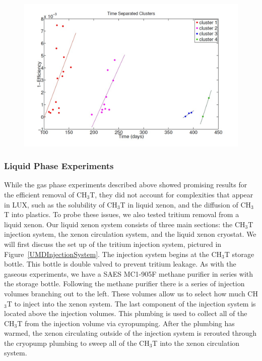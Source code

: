 \begin{figure}
\includegraphics[scale=.4]{GasPhaseRemoval_RestTime.jpg} 
\label{UMDGasRestTime}
\end{figure}



\subsubsection{Liquid Phase Experiments}

While the gas phase experiments described above showed promising results for the efficient removal of CH$_3$T, they did not account for complexities that appear in LUX, such as the solubility of CH$_3$T in liquid xenon, and the diffusion of CH$_3$T into plastics.  To probe these issues, we also tested tritium removal from a liquid xenon. Our liquid xenon system consists of three main sections: the CH$_3$T injection system, the xenon circulation system, and the liquid xenon cryostat. We will first discuss the set up of the tritium injection system, pictured in Figure~\ref{UMDInjectionSystem}. The injection system begins at the CH$_3$T storage bottle. This bottle is double valved to prevent tritium leakage. As with the gaseous experiments, we have a SAES MC1-905F methane purifier in series with the storage bottle. Following the methane purifier there is a series of injection volumes branching out to the left. These volumes allow us to select how much CH$_3$T to inject into the xenon system. The last component of the injection system is located above the injection volumes. This plumbing is used to collect all of the CH$_3$T from the injection volume via cyropumping. After the plumbing has warmed, the xenon circulating outside of the injection system is rerouted through the cryopump plumbing to sweep all of the CH$_3$T into the xenon circulation system. 


